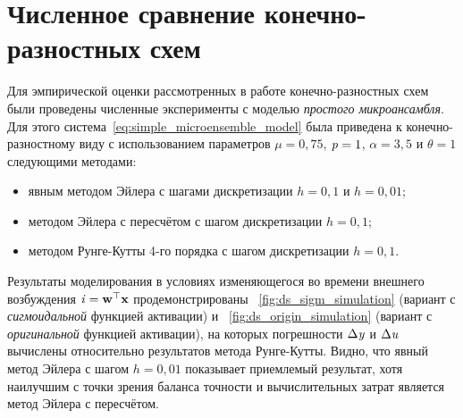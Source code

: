\section{Численное сравнение конечно-разностных схем}  \label{appendix:differential_schemes_compare}

Для эмпирической оценки рассмотренных в работе конечно-разностных схем были проведены численные эксперименты с моделью \textit{простого микроансамбля}. Для этого система~\eqref{eq:simple_microensemble_model} была приведена к конечно-разностному виду с использованием параметров $\mu = 0,75$, $\mathit{p} = 1$, $\alpha = 3,5$ и $\theta = 1$ следующими методами:
\begin{itemize}
    \item явным методом Эйлера с шагами дискретизации $h=0,1$ и $h=0,01$;
    \item методом Эйлера с пересчётом с шагом дискретизации $h=0,1$;
    \item методом Рунге-Кутты 4-го порядка с шагом дискретизации $h=0,1$.
\end{itemize}

Результаты моделирования в условиях изменяющегося во времени внешнего возбуждения $\mathit{i} = \mathrm{\mathbf{w}}^{\top} \mathrm{\mathbf{x}}$ продемонстрированы \onfigure~\ref{fig:ds_sigm_simulation} (вариант с \textit{сигмоидальной} функцией активации) и \onfigure~\ref{fig:ds_origin_simulation} (вариант с \textit{оригинальной} функцией активации), на которых погрешности $\Delta\mathit{y}$ и $\Delta\mathit{u}$ вычислены относительно результатов метода Рунге-Кутты. Видно, что явный метод Эйлера с шагом $h=0,01$ показывает приемлемый результат, хотя наилучшим с точки зрения баланса точности и вычислительных затрат является метод Эйлера с пересчётом.



